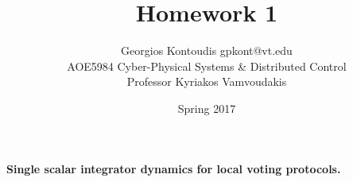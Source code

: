 \documentclass[12pt]{article}
\newenvironment{exercise}[2][Exercise]{\begin{trivlist}
\item[\hskip \labelsep {\bfseries #1}\hskip \labelsep {\bfseries #2.}]}{\end{trivlist}}
\begin{document}
 
 
\title{Homework 1}
\author{Georgios Kontoudis \textbullet{} gpkont@vt.edu\\ 
AOE5984 Cyber-Physical Systems \& Distributed Control\\
Professor Kyriakos Vamvoudakis} 
\date{Spring 2017}
 
\maketitle
\begin{exercise}{1} %
\textbf{Single scalar integrator dynamics for local voting protocols.}
\end{exercise}
\end{document}
